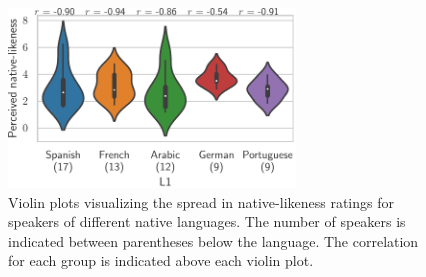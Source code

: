 \documentclass[11pt,a4paper]{article}
\begin{document}


\begin{figure}[ht!]
  \begin{center}
    \includegraphics[width=3in]{figures/L1/nl_ratings_most_freq.pdf}
    \caption{Violin plots visualizing the spread in native-likeness ratings for speakers of different native languages. The number of speakers is indicated between parentheses below the language. The correlation for each group is indicated above each violin plot.}
    \label{fig:L1-ratings}
  \end{center} 
\end{figure}
\end{document}
